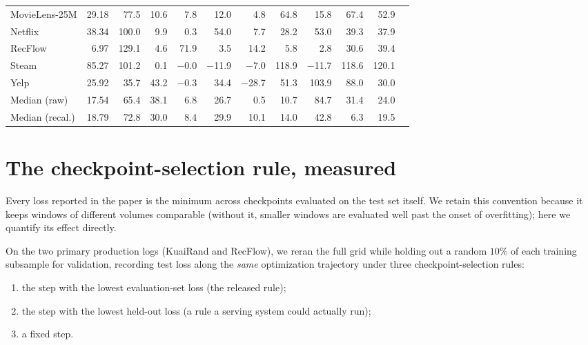 \documentclass[10pt,letterpaper]{article}
\begin{document}
\begin{table}[t]
\begin{tabular}{lrrrrrrrrrrr}
MovieLens-25M       & 29.18 &  77.5 &  10.6 &   7.8 &    12.0 &     4.8 &   64.8 &  15.8 &   67.4 &   52.9 \\
Netflix             & 38.34 & 100.0 &   9.9 &   0.3 &    54.0 &     7.7 &   28.2 &  53.0 &   39.3 &   37.9 \\
RecFlow             &  6.97 & 129.1 &   4.6 &  71.9 &     3.5 &    14.2 &    5.8 &   2.8 &   30.6 &   39.4 \\
Steam               & 85.27 & 101.2 &   0.1 & $-$0.0 & $-$11.9 & $-$7.0 &  118.9 & $-$11.7 &  118.6 &  120.1 \\
Yelp                & 25.92 &  35.7 &  43.2 & $-$0.3 &    34.4 & $-$28.7 &   51.3 & 103.9 &   88.0 &   30.0 \\
\midrule
Median (raw)        & 17.54 &  65.4 &  38.1 &   6.8 &    26.7 &     0.5 &   10.7 &  84.7 &   31.4 &   24.0 \\
Median (recal.)     & 18.79 &  72.8 &  30.0 &   8.4 &    29.9 &    10.1 &   14.0 &  42.8 &    6.3 &   19.5 \\
\bottomrule
\end{tabular}
\end{table}

\section{The checkpoint-selection rule, measured}
\label{sup:valstop}

Every loss reported in the paper is the minimum across checkpoints evaluated on the
test set itself. We retain this convention because it keeps
windows of different volumes comparable (without it, smaller windows are
evaluated well past the onset of overfitting); here we quantify
its effect directly.

On the two primary production logs (KuaiRand and RecFlow), we reran the full
grid while holding out a random $10\%$ of each training subsample for validation,
recording test loss along the \emph{same} optimization trajectory under
three checkpoint-selection rules:

\begin{enumerate}
\item the step with the lowest evaluation-set loss (the released rule);
\item the step with the lowest held-out loss (a rule a serving system could
      actually run);
\item a fixed step.
\end{enumerate}
\end{document}
